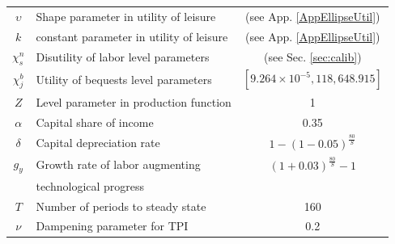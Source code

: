 \documentclass[letterpaper,12pt]{article}
\theoremstyle{definition}
\begin{document}
\begin{spacing}{1.5}
\begin{table}[htbp]
\begin{threeparttable}
\begin{tabular}{>{\footnotesize}c |>{\footnotesize}l |>{\footnotesize}c}
        $\upsilon$ & Shape parameter in utility of leisure & (see App. \ref{AppEllipseUtil}) \\
        $k$ & constant parameter in utility of leisure & (see App. \ref{AppEllipseUtil}) \\
        $\chi^n_s$ & Disutility of labor level parameters & (see Sec. \ref{sec:calib}) \\
        $\chi^b_j$ & Utility of bequests level parameters &  $[9.264 \times 10^{-5}, 118,648.915]$ \\
        \hline
        $Z$ & Level parameter in production function & 1 \\
        $\alpha$ & Capital share of income & 0.35 \\
        $\delta$ & Capital depreciation rate & $1-(1-0.05)^\frac{80}{S}$ \\
        $g_y$ & Growth rate of labor augmenting & $(1+0.03)^\frac{80}{S}-1$ \\[-2mm]
        & \quad technological progress & \\
        \hline
        $T$ & Number of periods to steady state & 160 \\
        $\nu$ & Dampening parameter for TPI & 0.2 \\
        \hline\hline
      \end{tabular}
      \end{threeparttable}
    \end{table}


\end{spacing}
\end{document}
